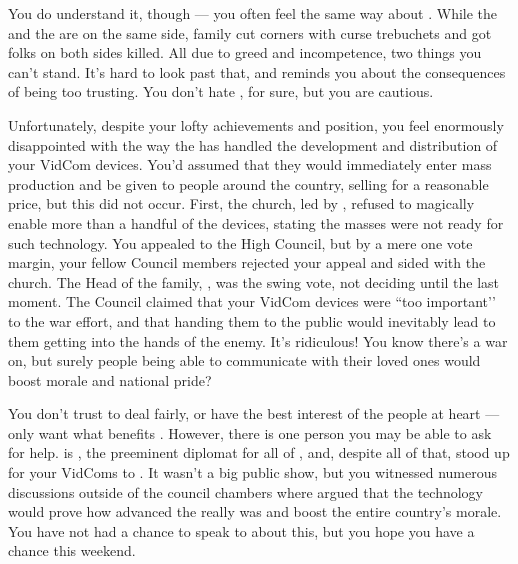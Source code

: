 \documentclass[char]{GL2020}
\begin{document}
You do understand it, though — you often feel the same way about \cLibAssist{\full}. While the \pFarm{} and the \pTech{} are on the same side, \cLibAssist{\their} family cut corners with curse trebuchets and got folks on both sides killed. All due to greed and incompetence, two things you can’t stand. It’s hard to look past that, and reminds you about the consequences of being too trusting. You don’t hate \cLibAssist{}, for sure, but you are cautious.    

Unfortunately, despite your lofty achievements and position, you feel enormously disappointed with the way the \pTech{} has handled the development and distribution of your VidCom devices.  You'd assumed that they would immediately enter mass production and be given to people around the country, selling for a reasonable price, but this did not occur. First, the church, led by \cAntiChup{\full}, refused to magically enable more than a handful of the devices, stating the masses were not ready for such technology. You appealed to the High Council, but by a mere one vote margin, your fellow Council members rejected your appeal and sided with the church. The Head of the \cHeir{\formal} family, \cFaledonParent{\full}, was the swing vote, not deciding until the last moment. The Council claimed that your VidCom devices were ``too important'’ to the war effort, and that handing them to the public would inevitably lead to them getting into the hands of the enemy. It's ridiculous!  You know there's a war on, but surely people being able to communicate with their loved ones would boost morale and national pride? 

You don't trust \cFaledonParent{} to deal fairly, or have the best interest of the people at heart — \cFaldedonParent{\they} only want\cFaldedonParent{\verbs} what benefits \cFaldedonParent{\them}. However, there is one person you may be able to ask for help.  \cDiplomat{\full} is \cFaledonParent{\sibling}, the preeminent diplomat for all of \pTech{}, and, despite all of that, stood up for your VidComs to \cFaledonParent{\them}.  It wasn’t a big public show, but you witnessed numerous discussions outside of the council chambers where \cDiplomat{} argued that the technology would prove how advanced the \pTech{} really was and boost the entire country’s morale.  You have not had a chance to speak to \cDiplomat{} about this, but you hope you have a chance this weekend.    
\end{document}
